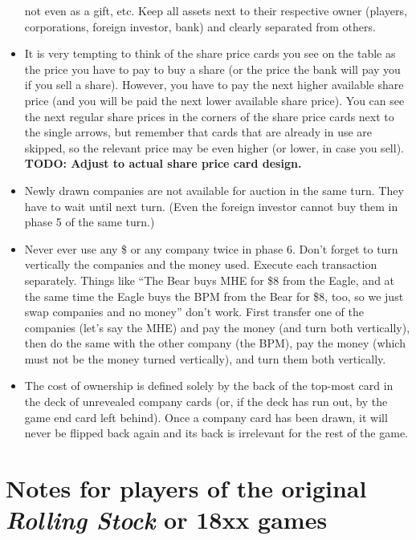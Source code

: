\documentclass[10pt,final]{report}
\begin{document}
\begin{multicols}{2}
\begin{itemize}
  not even as a gift, etc. Keep all assets next to their respective
  owner (players, corporations, foreign investor, bank) and clearly
  separated from others.
\item It is very tempting to think of the share price cards you see on
  the table as the price you have to pay to buy a share (or the price
  the bank will pay you if you sell a share). However, you have to pay
  the next higher available share price (and you will be paid the next
  lower available share price). You can see the next regular share
  prices in the corners of the share price cards next to the single
  arrows, but remember that cards that are already in use are skipped,
  so the relevant price may be even higher (or lower, in case you
  sell). \textbf{TODO: Adjust to actual share price card design.}
\item Newly drawn companies are not available for auction in the same
  turn. They have to wait until next turn. (Even the foreign investor
  cannot buy them in phase 5 of the same turn.)
\item Never ever use any \$ or any company twice in phase 6. Don't
  forget to turn vertically the companies and the money used. Execute
  each transaction separately. Things like ``The Bear buys MHE for \$8
  from the Eagle, and at the same time the Eagle buys the BPM from the
  Bear for \$8, too, so we just swap companies and no money'' don't
  work. First transfer one of the companies (let's say the MHE) and
  pay the money (and turn both vertically), then do the same with the
  other company (the BPM), pay the money (which must not be the money
  turned vertically), and turn them both vertically.
\item The cost of ownership is defined solely by the back of the
  top-most card in the deck of unrevealed company cards (or, if the
  deck has run out, by the game end card left behind). Once a company
  card has been drawn, it will never be flipped back again and its
  back is irrelevant for the rest of the game.
\end{itemize}
\end{multicols}

\chapter{Notes for players of the original
  \emph{Rolling Stock} or 18xx games}
\end{document}

